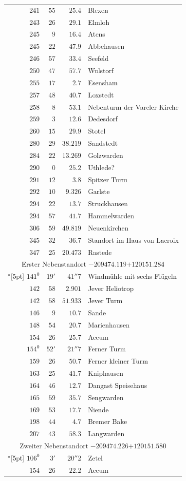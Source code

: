 \begin{longtable}{@{}rrrp{.61\linewidth}@{}}
\(241\)&\(55\)&\(25.4\)&\raggedright Blexen\tabularnewline
\(243\)&\(26\)&\(29.1\)&\raggedright Elmloh\tabularnewline
\(245\)&\(9\)&\(16.4\)&\raggedright Atens\tabularnewline
\(245\)&\(22\)&\(47.9\)&\raggedright Abbehausen\tabularnewline
\(246\)&\(57\)&\(33.4\)&\raggedright Seefeld\tabularnewline
\(250\)&\(47\)&\(57.7\)&\raggedright Wulstorf\tabularnewline
\(255\)&\(17\)&\(2.7\)&\raggedright Esensham\tabularnewline
\(257\)&\(48\)&\(40.7\)&\raggedright Loxstedt\tabularnewline
\(258\)&\(8\)&\(53.1\)&\raggedright Nebenturm der Vareler Kirche\tabularnewline
\(259\)&\(3\)&\(12.6\)&\raggedright Dedesdorf\tabularnewline
\(260\)&\(15\)&\(29.9\)&\raggedright Stotel\tabularnewline
\(280\)&\(29\)&\(38.219\)&\raggedright Sandstedt\tabularnewline
\(284\)&\(22\)&\(13.269\)&\raggedright Golzwarden\tabularnewline
\(290\)&\(0\)&\(25.2\)&\raggedright Uthlede?\tabularnewline
\(291\)&\(12\)&\(3.8\)&\raggedright Spitzer Turm\tabularnewline
\(292\)&\(10\)&\(9.326\)&\raggedright Garlste\tabularnewline
\(294\)&\(22\)&\(13.7\)&\raggedright Struckhausen\tabularnewline
\(294\)&\(57\)&\(41.7\)&\raggedright Hammelwarden\tabularnewline
\(306\)&\(59\)&\(49.819\)&\raggedright Neuenkirchen\tabularnewline
\(345\)&\(32\)&\(36.7\)&\raggedright Standort im Haus von Lacroix\tabularnewline
\(347\)&\(25\)&\(20.473\)&\raggedright Rastede\tabularnewline
\multicolumn{4}{c}{Erster Nebenstandort \(-209474.119\)\qquad\(+120151.284\)}\\*[5pt]
\(141^{0}\)&\(19'\)&\(41''7\)&\raggedright Windmühle mit sechs Flügeln\tabularnewline
\(142\)&\(58\)&\(2.901\)&\raggedright Jever Heliotrop\tabularnewline
\(142\)&\(58\)&\(51.933\)&\raggedright Jever Turm\tabularnewline
\(146\)&\(9\)&\(10.7\)&\raggedright Sande\tabularnewline
\(148\)&\(54\)&\(20.7\)&\raggedright Marienhausen\tabularnewline
\(154\)&\(26\)&\(25.7\)&\raggedright Accum\tabularnewline
\(154^{0}\)&\(52'\)&\(21''7\)&\raggedright Ferner Turm\tabularnewline
\(159\)&\(26\)&\(50.7\)&\raggedright Ferner kleiner Turm\tabularnewline
\(163\)&\(25\)&\(41.7\)&\raggedright Kniphausen\tabularnewline
\(164\)&\(46\)&\(12.7\)&\raggedright Dangast Speisehaus\tabularnewline
\(165\)&\(59\)&\(35.7\)&\raggedright Sengwarden\tabularnewline
\(169\)&\(53\)&\(17.7\)&\raggedright Niende\tabularnewline
\(198\)&\(44\)&\(4.7\)&\raggedright Bremer Bake\tabularnewline
\(207\)&\(43\)&\(58.3\)&\raggedright Langwarden\tabularnewline
\multicolumn{4}{c}{Zweiter Nebenstandort \(-209474.226\)\qquad\(+120151.580\)}\\*[5pt]
\(106^{0}\)&\(3'\)&\(20''2\)&\raggedright Zetel\tabularnewline
\(154\)&\(26\)&\(22.2\)&\raggedright Accum\tabularnewline

\end{longtable}
